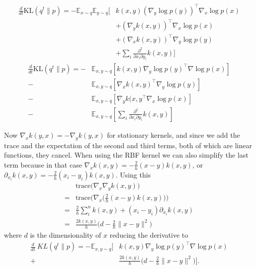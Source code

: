 \documentclass{article}
\begin{document}
    \begin{align}
        \frac{d}{dt} \text{KL}( q^t \| p ) = - \mathbb{E}_{x\sim q} \mathbb{E}_{y \sim q} \big[
            & k(x,y) (\nabla_y \log p(y))^\top \nabla_x \log p(x) \\
            &+ (\nabla_y k(x,y) )^\top \nabla_x \log p(x) \\
            &+ (\nabla_x k(x,y) )^\top \nabla_y \log p(y) \\
            &+ \sum_i \frac{ \partial^2 }{ \partial x_i \partial y_i } k(x,y) \big]
    \end{align}
    \begin{align}
        \frac{d}{dt} \text{KL} ( q^t \| p ) =
        -& \mathbb{E}_{x,y\sim q} \left[ k(x,y) \nabla_y \log p(y)^\top \nabla \log p(x) \right] \\ 
        -& \mathbb{E}_{x,y\sim q} \left[ \nabla_x k(x,y)^\top \nabla_y \log p(y) \right] \\ 
        -& \mathbb{E}_{x,y\sim q} \left[ \nabla_y k(x,y^\top \nabla_x \log p(x) \right] \\ 
        -& \mathbb{E}_{x,y\sim q} \left[ \sum_i \frac{ \partial^2 }{ \partial x_i \partial y_i } k(x,y) \right]
    \end{align}

    Now $\nabla_x k(y,x) = - \nabla_y k(y,x)$ for stationary kernels, and since we add the trace and the expectation of 
    the second and third terms, both of which are linear functions, they cancel.
    When using the RBF kernel we can also simplify the last term because in that case $\nabla_x k(x,y) = -\frac{2}{h} (x-y) k(x,y) $,
    or $\partial_{x_i} k(x,y) = -\frac{2}{h} (x_i - y_i) k(x,y)$. Using this 
    \begin{align}
        &\text{trace} \Big( \nabla_x \nabla_y k(x,y) \Big) \\
        = &\text{trace} \Big( \nabla_x \big( \frac{2}{h} (x-y)k(x,y) \big) \Big) \\
        = &\frac{2}{h} \sum_{i}^{n} k(x,y) + (x_i - y_i) \partial_{x_i} k(x,y) \\
        = & \frac{2k(x,y)}{h}\Big( d - \frac{2}{h}\|x-y\|^2 \Big)
    \end{align}
    where $d$ is the dimensionality of $x$
    reducing the derivative to
    \begin{align}
        \frac{d}{dt}\ KL( q^t \| p ) = - \mathbb{E}_{x,y\sim q} \Bigg[ &k(x,y) \nabla_y \log p(y)^\top \nabla \log p(x) \\ 
        +& \frac{2k(x,y)}{h}\Big( d - \frac{2}{h}\|x-y\|^2 \Big)\Bigg].
    \end{align}
\end{document}
